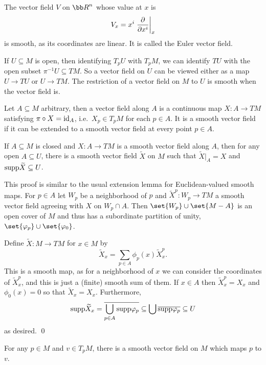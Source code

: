\eexam

\bexam

    The vector field $V$ on $\bR^n$ whose value at $x$ is
    $$ V_x = x^i\left.{{\partial }\over{\partial x^i}}\right|_x $$
    is smooth, as its coordinates are linear.
    It is called the {\emphcolor Euler vector field}.

\eexam

If $U\subseteq M$ is open, then identifying $T_pU$ with $T_pM$, we can identify $TU$ with the open subset $\pi^{-1}U\subseteq TM$.
So a vector field on $U$ can be viewed either as a map $U\to TU$ or $U\to TM$.
The restriction of a vector field on $M$ to $U$ is smooth when the vector field is.

Let $A\subseteq M$ arbitrary, then a {\emphcolor vector field along $A$} is a continuous map $X\colon A\to TM$ satisfying $\pi\circ X={\rm id}_A$,
i.e.\ $X_p\in T_pM$ for each $p\in A$.
It is a smooth vector field if it can be extended to a smooth vector field at every point $p\in A$.

\blemm

    If $A\subseteq M$ is closed and $X\colon A\to TM$ is a smooth vector field along $A$, then for any open $A\subseteq U$,
    there is a smooth vector field $\tilde X$ on $M$ such that $\tilde X|_A=X$ and ${\rm supp}\widetilde X\subseteq U$.

\elemm

\bproof

    This proof is similar to the usual extension lemma for Euclidean-valued smooth maps.
    For $p\in A$ let $W_p$ be a neighborhood of $p$ and $\tilde X^p\colon W_p\to TM$ a smooth vector field agreeing with $X$ on $W_p\cap A$.
    Then $\set{W_p}\cup\set{M-A}$ is an open cover of $M$ and thus has a subordinate partition of unity, $\set{\phi_p}\cup\set{\phi_0}$.

    Define $\tilde X\colon M\to TM$ for $x\in M$ by
    $$ \tilde X_x = \sum_{p\in A}\phi_p(x)\tilde X^p_x . $$
    This is a smooth map, as for a neighborhood of $x$ we can consider the coordinates of $\tilde X^p_x$, and this is just a (finite)
    smooth sum of them.
    If $x\in A$ then $\tilde X^p_x=X_x$ and $\phi_0(x)=0$ so that $\tilde X_x=X_x$.
    Furthermore,
    $$ {\rm supp}\widetilde X_x = \overline{\bigcup_{p\in A}{\rm supp}\varphi_p} \subseteq \bigcup\overline{{\rm supp}\varphi_p} \subseteq U $$
    as desired.
    \qed

\eproof

\bcoro

    For any $p\in M$ and $v\in T_pM$, there is a smooth vector field on $M$ which maps $p$ to $v$.

